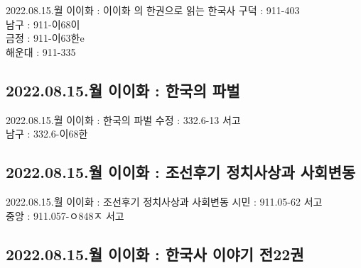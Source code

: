 \documentclass[aspectratio=1610,17pt,xcolor=pdftex,dvipsnames,table,handout]{beamer}
\begin{document}
		\begin{frame} [t,plain]
			\begin{block} {2022.08.15.월  이이화 : 이이화 의 한권으로 읽는 한국사 }
구덕	:	911-403	\\
남구	:	911-이68이	\\
금정	:	911-이63한e	\\
해운대	:	911-335	\\
			\end{block}
		\end{frame}

		\subsection{2022.08.15.월  이이화 : 한국의 파벌}
		
		\begin{frame} [t,plain]
			\begin{block} {2022.08.15.월  이이화 : 한국의 파벌}
수정	:	332.6-13 서고	\\
남구	:	332.6-이68한	\\

			\end{block}
		\end{frame}

		\subsection{2022.08.15.월  이이화 : 조선후기 정치사상과 사회변동}
		
		\begin{frame} [t,plain]
			\begin{block} {2022.08.15.월  이이화 : 조선후기 정치사상과 사회변동}
시민	:	911.05-62 서고	\\
중앙	:	911.057-ㅇ848ㅈ 서고	\\

			\end{block}
		\end{frame}

		\subsection{2022.08.15.월  이이화 : 한국사 이야기 전22권}
		
\end{document}
